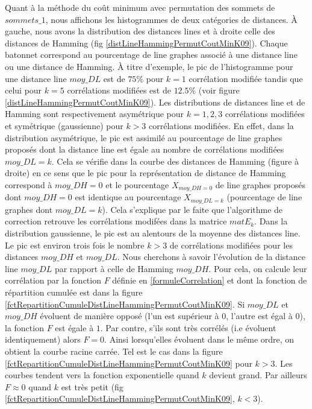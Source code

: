 \documentclass[onecolumn, 12pt]{book}
\begin{document}
Quant \`a la m\'ethode du co\^ut minimum avec permutation des sommets de $sommets\_1$, nous affichons les histogrammes de deux cat\'egories de distances. \`A gauche, nous avons la distribution des distances lines et \`a droite celle des distances de Hamming (fig \ref{distLineHammingPermutCoutMinK09}). Chaque batonnet correspond au pourcentage de line graphes associ\'e \`a une distance line ou une distance de Hamming. \`A titre d'exemple, le pic de l'histogramme pour une distance line $moy\_DL$ est de $75\%$ pour $k=1$ corr\'elation modifi\'ee tandis que celui pour  $k=5$ corr\'elations modifi\'ees est de $12.5\%$ (voir figure \ref{distLineHammingPermutCoutMinK09}).
Les distributions de distances line et de Hamming sont respectivement asym\'etrique pour $k = 1,2,3$ corr\'elations modifi\'ees et sym\'etrique (gaussienne) pour $k > 3$ corr\'elations modifi\'ees.
En effet, dans la distribution asym\'etrique, le pic est assimil\'e au pourcentage de line graphes propos\'es dont la distance line est \'egale au nombre de corr\'elations modifi\'ees $moy\_DL = k$. Cela se v\'erifie dans la courbe des distances de Hamming (figure \`a droite) en ce sens que le pic pour la repr\'esentation de distance de Hamming correspond \`a $moy\_DH = 0$ et le pourcentage $X_{moy\_DH=0}$ de line graphes propos\'es dont $moy\_DH = 0$ est identique au pourcentage $X_{moy\_DL=k}$ (pourcentage de line graphes dont $moy\_DL = k$). 
Cela s'explique par le faite que l'algorithme de correction retrouve les corr\'elations modif\'ees dans la matrice $matE_{k}$.
Dans la distribution gaussienne, le pic est au alentours de la moyenne des distances line. Le pic est environ trois fois le nombre $k>3$ de corr\'elations modifi\'ees pour les distances $moy\_DH$ et $moy\_DL$. Nous cherchons \`a savoir l'\'evolution de la distance line $moy\_DL$ par rapport \`a celle de Hamming $moy\_DH$. Pour cela, on calcule leur corr\'elation par la fonction $F$ d\'efinie en \ref{formuleCorrelation} et dont la fonction de r\'epartition cumul\'ee est dans la figure \ref{fctRepartitionCumuleDistLineHammingPermutCoutMinK09}.
Si $moy\_DL$ et $moy\_DH$ \'evoluent de mani\`ere oppos\'e (l'un est sup\'erieur \`a $0$, l'autre est \'egal \`a $0$), la fonction $F$ est \'egale \`a $1$. Par contre, s'ils sont tr\`es corr\'el\'es (i.e \'evoluent identiquement) alors $F = 0$.
Ainsi lorsqu'elles \'evoluent dans le m\^eme ordre, on obtient la courbe racine carr\'ee. Tel est le cas dans la figure \ref{fctRepartitionCumuleDistLineHammingPermutCoutMinK09} pour $k > 3$. 
Les courbes tendent vers la fonction exponentielle quand $k$ devient grand. 
Par ailleurs $F \approx 0$ quand $k$ est tr\`es petit (fig \ref{fctRepartitionCumuleDistLineHammingPermutCoutMinK09}, $k<3$).
\newline
\end{document}

